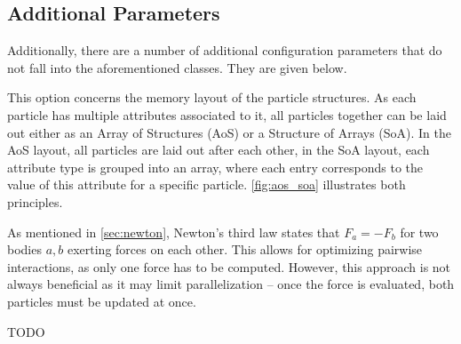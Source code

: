 \subsection{Additional Parameters}
Additionally, there are a number of additional configuration parameters that do not fall into the aforementioned classes. They are given below.

\begin{description}[leftmargin=!,labelwidth=\widthof{\textbf{Cell size factor }}]
	\item[\textbf{Data Layout}] This option concerns the memory layout of the particle structures. As each particle has multiple attributes associated to it, all particles together can be laid out either as an Array of Structures (AoS) or a Structure of Arrays (SoA). In the AoS layout, all particles are laid out after each other, in the SoA layout, each attribute type is grouped into an array, where each entry corresponds to the value of this attribute for a specific particle. \autoref{fig:aos_soa} illustrates both principles.
	\item[\textbf{Newton3}] As mentioned in \autoref{sec:newton}, Newton's third law states that $F_a = -F_b$ for two bodies $a, b$ exerting forces on each other. This allows for optimizing pairwise interactions, as only one force has to be computed. However, this approach is not always beneficial as it may limit parallelization -- once the force is evaluated, both particles must be updated at once.
	\item[\textbf{Cell Size Factor}] TODO %
\end{description}

